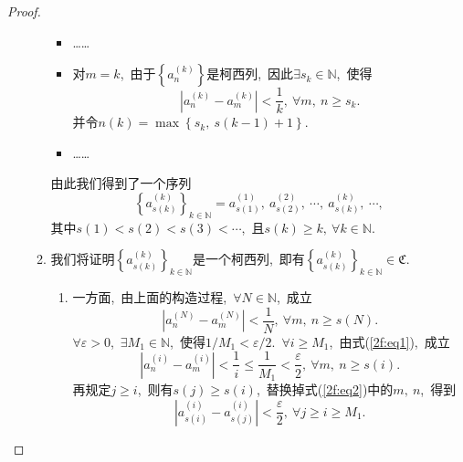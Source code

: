 \documentclass[UTF8, twoside]{ctexart}
\theoremstyle{nonumberplain}
\newtheorem{proof}{\heiti 证明}  %
\theoremstyle{nonumberplain}
\theoremstyle{plain}
\begin{document}
\begin{proof}
\begin{enumerate}
\begin{enumerate}
\begin{itemize}
					\item ……
					
					\item 对$m=k$,\ 由于$\left\{ a_{n}^{\left( k \right)} \right\}$是柯西列,\ 因此$\exists {{s}_{k}}\in \mathbb{N}$,\ 使得
					\[
						\left| a_{n}^{\left( k \right)}-a_{m}^{\left( k \right)} \right|<\frac{1}{k},
						\ \forall m,\ n\ge {{s}_{k}}.
					\]
					并令$n\left( k \right)=\max \left\{ {{s}_{k}},\ s\left( k-1 \right)+1 \right\}$.\ 
					
					\item ……
				\end{itemize}
				由此我们得到了一个序列
				\[
					{{\left\{ a_{s\left( k \right)}^{\left( k \right)} \right\}}_{k\in \mathbb{N}}}=a_{s\left( 1 \right)}^{\left( 1 \right)},\ a_{s\left( 2 \right)}^{\left( 2 \right)},\ \cdots,\ a_{s\left( k \right)}^{\left( k \right)},\ \cdots ,
				\]
				其中$s\left( 1 \right)<s\left( 2 \right)<s\left( 3 \right)<\cdots $,\ 且$s\left( k \right)\ge k,
				\ \forall k\in \mathbb{N}$.
				\vskip 0.3cm
				
				\item 我们将证明${{\left\{ a_{s\left( k \right)}^{\left( k \right)} \right\}}_{k\in \mathbb{N}}}$是一个柯西列,\ 
				即有${{\left\{ a_{s\left( k \right)}^{\left( k \right)} \right\}}_{k\in \mathbb{N}}} \in \mathfrak{C}$.
				\vskip 0.3cm 
				 
				\begin{enumerate}
					\item 一方面,\ 由上面的构造过程,\ $\forall N\in \mathbb{N}$,\ 成立
					\begin{equation} \label{2f:eq1}
						\left| a_{n}^{\left( N \right)}-a_{m}^{\left( N \right)} \right|<\frac{1}{N},
						\ \forall m,\ n\ge s\left( N \right).
					\end{equation}
					$\forall \varepsilon >0$,\ $\exists {{M}_{1}}\in \mathbb{N}$,\ 使得$1/{{M}_{1}}<\varepsilon /2$.\ $\forall i\ge {{M}_{1}}$,\ 由式(\ref{2f:eq1}),\ 成立
					\begin{equation} \label{2f:eq2}
						\left| a_{n}^{\left( i \right)}-a_{m}^{\left( i \right)} \right|<\frac{1}{i}\le \frac{1}{{{M}_{1}}}<\frac{\varepsilon }{2},\ \forall m,\ n\ge s\left( i \right).
					\end{equation}
					再规定$j\ge i$,\ 则有$s\left( j \right)\ge s\left( i \right)$,\ 替换掉式(\ref{2f:eq2})中的$m,\ n$,\ 得到
					\begin{equation} \label{2f:eq3}
						\left| a_{s\left( i \right)}^{\left( i \right)}-a_{s\left( j \right)}^{\left( i \right)} \right|<\frac{\varepsilon }{2},\ \forall j\ge i\ge {{M}_{1}}.
					\end{equation}
					\vskip 0.3cm
					

\end{enumerate}
\end{enumerate}
\end{enumerate}
\end{proof}
\end{document}
